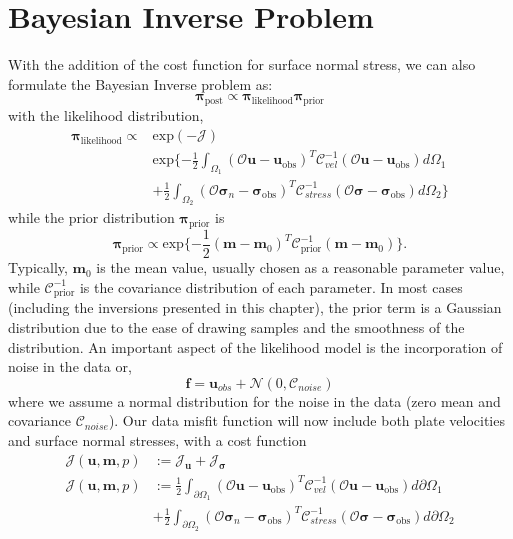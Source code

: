 \documentclass[12pt]{article}
\newcommand{\mm}{{\ensuremath{\boldsymbol{m}}}}
\newcommand{\uu}{{\ensuremath{\boldsymbol{u}}}}
\newcommand{\ff}{{\ensuremath{\boldsymbol{f}}}}
\newcommand{\ppi}{{\ensuremath{\boldsymbol{\pi}}}}
\newcommand{\ssigma}{{\ensuremath{\boldsymbol{\sigma}}}}
\begin{document}
 
\section*{Bayesian Inverse Problem}
With the addition of the cost function for surface normal stress, we can also formulate the Bayesian Inverse problem as:
\begin{equation}
\ppi_{\text{post}} \propto \ppi_{\text{likelihood}}\ppi_{\text{prior}}
\end{equation}
with the likelihood distribution,
\begin{equation}
\begin{split}
\ppi_{\text{likelihood}} \propto & \text{exp}(-\mathcal{J}) \\
                           & \text{exp}\{-\frac{1}{2}\int_{\Omega_1} (\mathcal{O}\uu-\uu_{\text{obs}})^T\mathcal{C}^{-1}_{vel}(\mathcal{O}\uu-\uu_{\text{obs}})d\Omega_1 \\
&+ \frac{1}{2}\int_{\Omega_2} (\mathcal{O}\ssigma_n-\ssigma_{\text{obs}})^T\mathcal{C}^{-1}_{stress}(\mathcal{O}\ssigma -\ssigma_{\text{obs}})d\Omega_2 \} 
\end{split}
\end{equation}
while the prior distribution $\ppi_{\text{prior}}$ is
\begin{equation}
\ppi_{\text{prior}}\propto \text{exp}\{-\frac{1}{2}(\mm-\mm_0)^T\mathcal{C}^{-1}_{\text{prior}}(\mm -\mm_0)\}. 
\end{equation}
Typically, $\mm_0$ is the mean value, usually chosen as a reasonable parameter value, while $\mathcal{C}^{-1}_{\text{prior}}$ is the covariance  distribution of each parameter. In most cases (including the inversions presented in this chapter), the prior term is a Gaussian distribution due to the ease of drawing samples and the smoothness of the distribution. An important aspect of the likelihood model is the incorporation of noise in the data or,
\begin{equation}
\ff = \uu_{obs} + \mathcal{N}(0,\mathcal{C}_{noise})
\end{equation}
where we assume a normal distribution for the noise in the data (zero mean and covariance $\mathcal{C}_{noise}$).
Our data misfit function will now include both plate velocities and surface normal stresses, with a cost function
\begin{equation}
\begin{split}
  \mathcal{J}(\uu,\mm,p)&:= \mathcal{J}_{\uu} + \mathcal{J}_{\ssigma} \\
  \mathcal{J}(\uu,\mm,p)&:= \frac{1}{2}\int_{\partial \Omega_1} (\mathcal{O}\uu-\uu_{\text{obs}})^T\mathcal{C}^{-1}_{vel}(\mathcal{O}\uu-\uu_{\text{obs}})d\partial\Omega_1 \\ 
   &+ \frac{1}{2}\int_{\partial\Omega_2} (\mathcal{O}\ssigma_n-\ssigma_{\text{obs}})^T\mathcal{C}^{-1}_{stress}(\mathcal{O}\ssigma -\ssigma_{\text{obs}})d\partial\Omega_2 \\ 
\end{split}
\end{equation}
\end{document}
